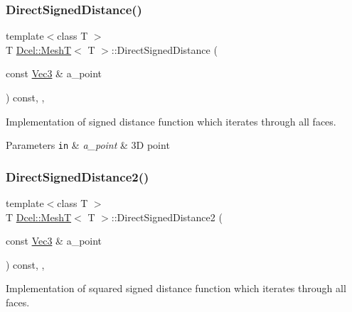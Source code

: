 \subsubsection{\texorpdfstring{Direct\+Signed\+Distance()}{DirectSignedDistance()}}
{\footnotesize\ttfamily template$<$class T $>$ \\
T \hyperlink{classDcel_1_1MeshT}{Dcel\+::\+MeshT}$<$ T $>$\+::Direct\+Signed\+Distance (\begin{DoxyParamCaption}\item[{const \hyperlink{classDcel_1_1MeshT_a646c5d8f66b3079bca35fe4186493627}{Vec3} \&}]{a\+\_\+point }\end{DoxyParamCaption}) const\hspace{0.3cm}{\ttfamily [inline]}, {\ttfamily [protected]}, {\ttfamily [noexcept]}}



Implementation of signed distance function which iterates through all faces. 


\begin{DoxyParams}[1]{Parameters}
\mbox{\tt in}  & {\em a\+\_\+point} & 3D point \\
\hline
\end{DoxyParams}
\mbox{\label{classDcel_1_1MeshT_ac00a6da46649246a3a2db70b29bb2407}} 
\subsubsection{\texorpdfstring{Direct\+Signed\+Distance2()}{DirectSignedDistance2()}}
{\footnotesize\ttfamily template$<$class T $>$ \\
T \hyperlink{classDcel_1_1MeshT}{Dcel\+::\+MeshT}$<$ T $>$\+::Direct\+Signed\+Distance2 (\begin{DoxyParamCaption}\item[{const \hyperlink{classDcel_1_1MeshT_a646c5d8f66b3079bca35fe4186493627}{Vec3} \&}]{a\+\_\+point }\end{DoxyParamCaption}) const\hspace{0.3cm}{\ttfamily [inline]}, {\ttfamily [protected]}, {\ttfamily [noexcept]}}



Implementation of squared signed distance function which iterates through all faces. 

